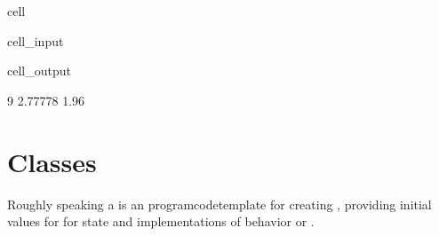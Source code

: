 \documentclass[a4paper,10pt,english]{jupyterBook}
\begin{document}
\begin{sphinxuseclass}{cell}\begin{sphinxVerbatimInput}

\begin{sphinxuseclass}{cell_input}
\begin{sphinxVerbatim}[commandchars=\\\{\}]
\end{sphinxVerbatim}

\end{sphinxuseclass}\end{sphinxVerbatimInput}
\begin{sphinxVerbatimOutput}

\begin{sphinxuseclass}{cell_output}
\begin{sphinxVerbatim}[commandchars=\\\{\}]
9 2.77778 1.96
\end{sphinxVerbatim}

\end{sphinxuseclass}\end{sphinxVerbatimOutput}

\end{sphinxuseclass}
\sphinxstepscope


\chapter{Classes}
\label{\detokenize{text/progtut/classes:classes}}\label{\detokenize{text/progtut/classes::doc}}
\sphinxAtStartPar
Roughly speaking a  is an  program\sphinxhyphen{}code\sphinxhyphen{}template
for creating , providing initial values for for state  and implementations of behavior  or .
\end{document}
